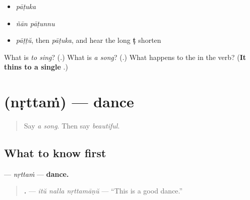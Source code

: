 \begin{itemize}
\raggedright
  \item \emph{pāṭuka}
  \item \emph{ñān pāṭunnu}
  \item \emph{pāṭṭŭ}, then \emph{pāṭuka}, and hear the long \textbf{ṭ} shorten
\end{itemize}

\begin{tcolorbox}[breakable,colback=teal!4,colframe=teal!35!black,title={Before you move on}]
What is \emph{to sing}? (\textbf{}.) What is \emph{a song}? (\textbf{}.) What happens to the \textbf{} in the verb? (\textbf{It thins to a single }.)
\end{tcolorbox}
\section[\texorpdfstring{\ml{നൃത്തം} (nṛttaṁ)}{നൃത്തം (nṛttaṁ)}]{ (nṛttaṁ) — dance}

\label{lesson:ML-C99-nrttham}



\begin{quote}
Say \emph{a song}. Then say \emph{beautiful}.
\end{quote}

\subsection*{What to know first}
\textbf{} — \emph{nṛttaṁ} — \textbf{dance.}

\begin{quote}
\textbf{  .} — \emph{itŭ nalla nṛttamāṇŭ} — \textquotedblleft{}This is a good dance.\textquotedblright{}
\end{quote}

